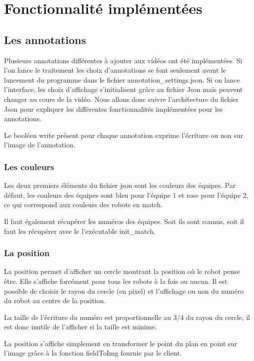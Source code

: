 \chapter{Fonctionnalité implémentées}

\section{Les annotations}

Plusieurs annotations différentes à ajouter aux vidéos ont été implémentées. Si l'on lance le traitement les choix d'annotations se font seulement avant le lancement du programme dans le fichier annotation\_settings.json.
Si on lance l'interface, les choix d'affichage s'initialisent grâce au fichier Json mais peuvent changer au cours de la vidéo. 
Nous allons donc suivre l'architecture du fichier Json pour expliquer les différentes fonctionnalités implémentées pour les annotations.
\bigskip

Le booléen write présent pour chaque annotation exprime l'écriture ou non sur l'image de l'annotation.
\bigskip



\subsection{Les couleurs}

Les deux premiers éléments du fichier json sont les couleurs des équipes. Par défaut, les couleurs des équipes sont bleu pour l'équipe 1 et rose pour l'équipe 2, ce qui correspond aux couleurs des robots en match.

Il faut également récupérer les numéros des équipes. Soit ils sont connus, soit il faut les récupérer avec le l'exécutable init\_match.

\subsection{La position}

La position permet d'afficher un cercle montrant la position où le robot pense être.
Elle s'affiche forcément pour tous les robots à la fois ou aucun. Il est possible de choisir le rayon du cercle (en pixel) et l'affichage ou non du numéro du robot au centre de la position. 
\bigskip

La taille de l'écriture du numéro est proportionnelle au 3/4 du rayon du cercle, il est donc inutile de l'afficher si la taille est minime.

La position s'affiche simplement en transformer le point du plan en point sur l'image grâce à la fonction fieldToImg fournie par le client.


